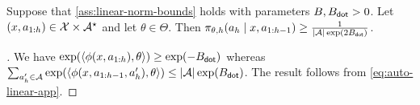\begin{lemma}\label{lemma:auto-linear-density-bound}
Suppose that \cref{ass:linear-norm-bounds} holds with parameters $B,B_{\mathsf{dot}}>0$. Let $(x,a_{1:h}) \in \mathcal{X}\times\mathcal{A}^\star$ and let $\theta\in\Theta$. Then $\pi_{\theta,h}(a_h\mid{}x,a_{1:h-1}) \geq \frac{1}{|\mathcal{A}|\exp(2B_{\mathsf{dot}})}$.
\end{lemma}

\begin{proof}[]
We have $\exp(\langle \phi(x,a_{1:h}),\theta\rangle) \geq \exp(-B_{\mathsf{dot}})$ whereas $\sum_{a_h'\in\mathcal{A}} \exp(\langle \phi(x,a_{1:h-1},a_h'),\theta\rangle) \leq |\mathcal{A}|\exp(B_{\mathsf{dot}})$. The result follows from \cref{eq:auto-linear-app}.
\end{proof}

